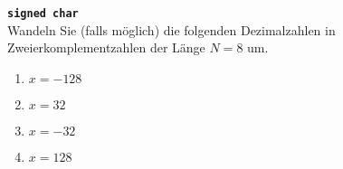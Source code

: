 \textbf{\texttt{signed char}}\\
Wandeln Sie (falls möglich) die folgenden Dezimalzahlen in Zweierkomplementzahlen der Länge $N = 8$ um.
\begin{enumerate}
	\item $x= -128$
	\item $x= 32$
	\item $x= -32$
	\item $x= 128$
\end{enumerate}
